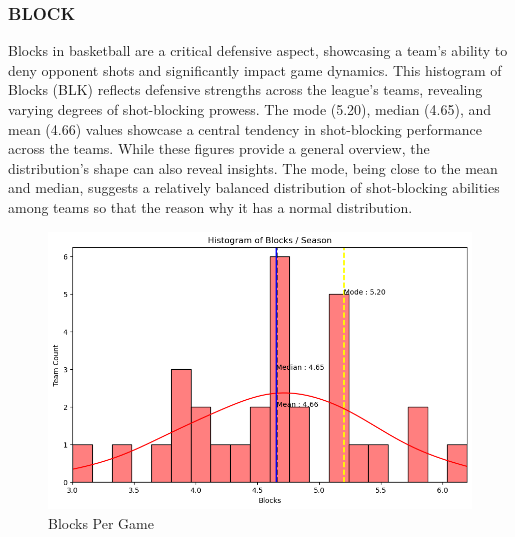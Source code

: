 \documentclass[conference]{IEEEtran}
\begin{document}
\subsubsection{BLOCK}
Blocks in basketball are a critical defensive aspect, showcasing a team's ability to deny opponent shots and significantly impact game dynamics. This histogram of Blocks (BLK) reflects defensive strengths across the league's teams, revealing varying degrees of shot-blocking prowess. The mode (5.20), median (4.65), and mean (4.66) values showcase a central tendency in shot-blocking performance across the teams. While these figures provide a general overview, the distribution's shape can also reveal insights. The mode, being close to the mean and median, suggests a relatively balanced distribution of shot-blocking abilities among teams so that the reason why it has a normal distribution. 
\begin{figure}[h]
    \centering
    \includegraphics[scale=0.41]{BLOCK_image.png}
    \caption{Blocks Per Game}
    \label{fig:enter-label}
\end{figure}
\vspace{\baselineskip}
\vspace{\baselineskip}
\end{document}
